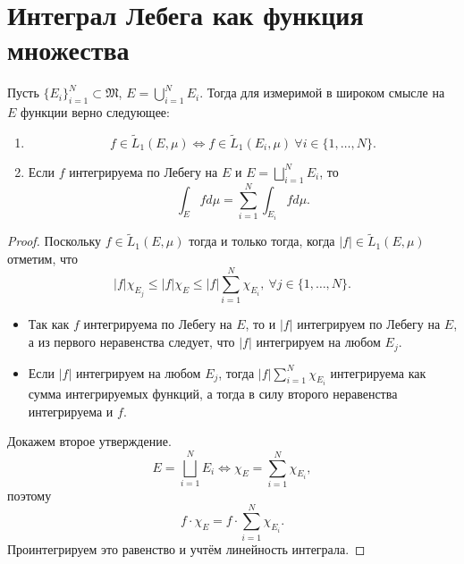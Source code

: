 \section{Интеграл Лебега как функция множества}
\begin{lemma}
    Пусть $\{E_i\}_{i=1}^N \subset \mathfrak{M}$, $E = \bigcup\limits_{i=1}^{N} E_i$.
    Тогда для измеримой в широком смысле на $E$ функции верно следующее:
    \begin{enumerate}
        \item $$f \in \widetilde{L}_1(E, \mu) \Longleftrightarrow f \in \widetilde{L}_1(E_i, \mu) \ \forall i \in \{1, \dots, N\}.$$
        \item Если $f$ интегрируема по Лебегу на $E$ и $E = \bigsqcup\limits_{i=1}^{N} E_i$, то
        \[\int_E f d\mu = \sum\limits_{i=1}^{N} \int_{E_i} f d\mu.\]
    \end{enumerate}
\end{lemma} 
\begin{proof}
    Поскольку $f \in \widetilde{L}_1(E, \mu)$ тогда и только тогда, когда $|f| \in \widetilde{L}_1(E, \mu)$
    отметим, что
    \[|f| \chi_{E_j} \leqslant |f| \chi_E \leqslant |f| \sum\limits_{i=1}^{N} \chi_{E_i}, \ \forall j \in \{1, \dots, N\}.\]
    \begin{itemize}
        \item[$\underline{\implies}$] Так как $f$ интегрируема по Лебегу на $E$, то и $|f|$ интегрируем по Лебегу на $E$, а из первого неравенства следует, что $|f|$ интегрируем на любом $E_j$.
        \item[$\underline{\impliedby}$] Если $|f|$ интегрируем на любом $E_j$, тогда $|f| \sum\limits_{i=1}^{N} \chi_{E_i}$ интегрируема как сумма интегрируемых функций, а тогда в силу второго неравенства интегрируема и $f$.
    \end{itemize}
    Докажем второе утверждение.
    \[E = \bigsqcup\limits_{i=1}^{N}E_i \Longleftrightarrow
    \chi_E = \sum\limits_{i=1}^{N}\chi_{E_i},\]
    поэтому
    \[f \cdot \chi_E = f \cdot \sum\limits_{i=1}^{N} \chi_{E_i}.\]
    Проинтегрируем это равенство и учтём линейность интеграла.
\end{proof} 

